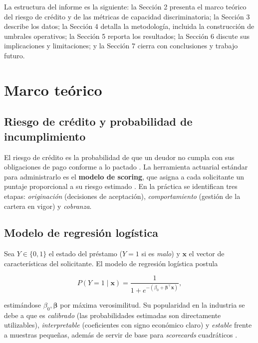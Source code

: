 \documentclass[11pt,letterpaper]{article}
\begin{document}
La estructura del informe es la siguiente: la Sección 2 presenta el marco
teórico del riesgo de crédito y de las métricas de capacidad discriminatoria;
la Sección 3 describe los datos; la Sección 4 detalla la metodología, incluida
la construcción de umbrales operativos; la Sección 5 reporta los resultados;
la Sección 6 discute sus implicaciones y limitaciones; y la Sección 7 cierra
con conclusiones y trabajo futuro.

\section{Marco teórico}

\subsection{Riesgo de crédito y probabilidad de incumplimiento}

El riesgo de crédito es la probabilidad de que un deudor no cumpla con sus
obligaciones de pago conforme a lo pactado \cite{bcbs2005,thomas2002}. La
herramienta actuarial estándar para administrarlo es el \textbf{modelo de
scoring}, que asigna a cada solicitante un puntaje proporcional a su riesgo
estimado \cite{anderson2007}. En la práctica se identifican tres etapas:
\emph{originación} (decisiones de aceptación), \emph{comportamiento}
(gestión de la cartera en vigor) y \emph{cobranza}.

\subsection{Modelo de regresión logística}

Sea $Y \in \{0,1\}$ el estado del préstamo ($Y=1$ si es \emph{malo}) y
$\mathbf{x}$ el vector de características del solicitante. El modelo de
regresión logística postula

\begin{equation}
  P(Y=1 \mid \mathbf{x}) = \frac{1}{1 + e^{-(\beta_0 + \boldsymbol{\beta}^\top \mathbf{x})}},
  \label{eq:logit}
\end{equation}

estimándose $\beta_0,\boldsymbol{\beta}$ por máxima verosimilitud. Su
popularidad en la industria se debe a que es \emph{calibrado} (las
probabilidades estimadas son directamente utilizables), \emph{interpretable}
(coeficientes con signo económico claro) y \emph{estable} frente a muestras
pequeñas, además de servir de base para \emph{scorecards} cuadráticos
\cite{anderson2007}.
\end{document}
